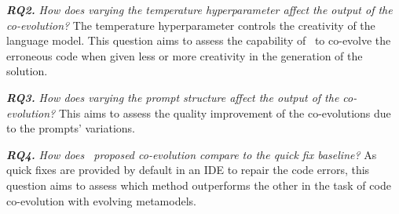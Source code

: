 \textbf{\emph{RQ2.}} \emph{	How does varying the temperature hyperparameter affect the output of the co-evolution?} %
	The temperature hyperparameter controls the creativity of the language model. 
	This question aims to assess the capability of \LLM~to co-evolve the erroneous code when given less or more creativity in the generation of the solution. 
	
	
\textbf{\emph{RQ3.}} \emph{	How does varying the prompt structure affect the output of the co-evolution? }%
	This aims to assess the quality improvement of the co-evolutions due to the prompts' variations.
	
	
	\textbf{\emph{RQ4.}} \emph{How does \LLM~proposed co-evolution compare to the quick fix baseline? }
	As quick fixes are provided by default in an IDE to repair the code errors, this question aims to assess which method outperforms the other in the task of code co-evolution with evolving metamodels. %
	
	



